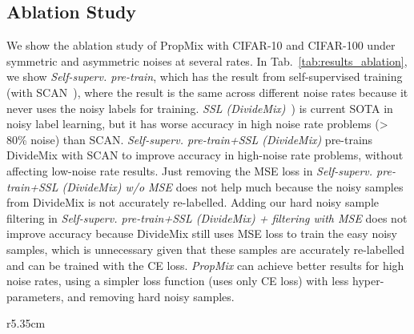 \documentclass{bmvc2k}
\begin{document}
\subsection{Ablation Study}
\label{sec:ablation}

We show the ablation study of PropMix with CIFAR-10 and CIFAR-100 under symmetric and asymmetric noises at several rates. In Tab.~\ref{tab:results_ablation}, we show \emph{Self-superv. pre-train}, which has the result from self-supervised training (with SCAN~\citep{SCAN}), where the result is the same across different noise rates because it never uses the noisy labels for training. 
\emph{SSL (DivideMix)}~\citep{DivideMix}) is current SOTA in noisy label learning, but it has worse accuracy in high noise rate problems (> 80\% noise) than SCAN. \emph{Self-superv. pre-train+SSL (DivideMix)} pre-trains DivideMix with SCAN to improve accuracy in high-noise rate problems, without affecting low-noise rate results.
Just removing the MSE loss in \emph{Self-superv. pre-train+SSL (DivideMix) w/o MSE} does not help much because the noisy samples from DivideMix is not accurately re-labelled.
Adding our hard noisy sample filtering in \emph{Self-superv. pre-train+SSL (DivideMix) + filtering with MSE} does not improve accuracy because DivideMix still uses MSE loss to train the easy noisy samples, which is unnecessary given that these samples are  accurately re-labelled and can be trained with the CE loss.
\emph{PropMix} can achieve better results for high noise rates, using a simpler loss function (uses only CE loss) with less hyper-parameters, and removing hard noisy samples.

\begin{wraptable}{r}{5.35cm}
\centering
{}
\caption{Test accuracy (\%) for WebVision~\citep{webvision}  by methods trained with 100 epochs. Baselines come from~\cite{DivideMix}. Top methods within $1\%$ in \textbf{bold}.}
\label{tab:res_WebVision}
\end{wraptable}
\end{document}

